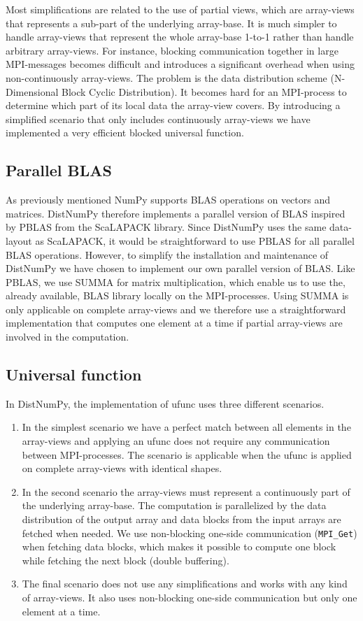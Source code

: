 \documentclass[10pt]{article}
\begin{document}
Most simplifications are related to the use of partial views, which are array-views that represents a sub-part of the underlying array-base. It is much simpler to handle array-views that represent the whole array-base 1-to-1 rather than handle arbitrary array-views. For instance, blocking communication together in large MPI-messages becomes difficult and introduces a significant overhead when using non-continuously array-views. The problem is the data distribution scheme (N-Dimensional Block Cyclic Distribution). It becomes hard for an MPI-process to determine which part of its local data the array-view covers. By introducing a simplified scenario that only includes continuously array-views we have implemented a very efficient blocked universal function.


\subsection{Parallel BLAS}
As previously mentioned NumPy supports BLAS operations on vectors and matrices. DistNumPy therefore implements a parallel version of BLAS inspired by PBLAS from the ScaLAPACK library. Since DistNumPy uses the same data-layout as ScaLAPACK, it would be straightforward to use PBLAS for all parallel BLAS operations. However, to simplify the installation and maintenance of DistNumPy we have chosen to implement our own parallel version of BLAS. Like PBLAS, we use SUMMA\cite{SUMMA_GeijnW97} for matrix multiplication, which enable us to use the, already available, BLAS library locally on the MPI-processes. Using SUMMA is only applicable on complete array-views and we therefore use a straightforward implementation that computes one element at a time if partial array-views are involved in the computation. 

\subsection{Universal function}
In DistNumPy, the implementation of ufunc uses three different scenarios.
\begin{enumerate}
\item In the simplest scenario we have a perfect match between all elements in the array-views and applying an ufunc does not require any communication between MPI-processes. The scenario is applicable when the ufunc is applied on complete array-views with identical shapes.
\item In the second scenario the array-views must represent a continuously part of the underlying array-base. The computation is parallelized by the data distribution of the output array and data blocks from the input arrays are fetched when needed. We use non-blocking one-side communication (\texttt{MPI\_Get}) when fetching data blocks, which makes it possible to compute one block while fetching the next block (double buffering).
\item The final scenario does not use any simplifications and works with any kind of array-views. It also uses non-blocking one-side communication but only one element at a time.
\end{enumerate}
\end{document}
